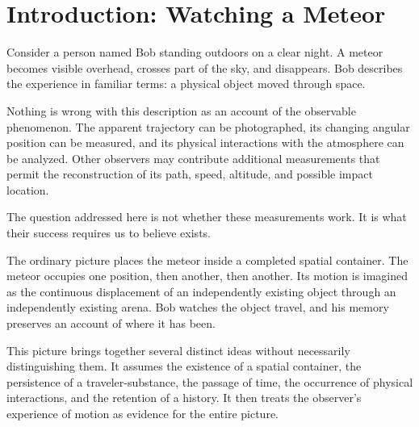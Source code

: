 \documentclass[12pt,onecolumn]{article}
\begin{document}
\begin{abstract}
The paper further adopts the TLM proposition that physical actuality is singular: there is one universal present, while elapsed proper time is local and information becomes available through relativistically constrained registration. This universal-present proposition is ontological and is not identified with an observer-independent global simultaneity coordinate.

The result is a standalone foundations argument. It does not modify established equations or predictions of quantum mechanics, special relativity, or general relativity. Its contribution is to distinguish timeless law from physical registration, and registered spatial experience from an independently existing spatial container, while identifying the additional mathematical work required to turn this interpretation into a predictive physical theory.
\end{abstract}

\section{Introduction: Watching a Meteor}

Consider a person named Bob standing outdoors on a clear night. A meteor becomes visible overhead, crosses part of the sky, and disappears. Bob describes the experience in familiar terms: a physical object moved through space.

Nothing is wrong with this description as an account of the observable phenomenon. The apparent trajectory can be photographed, its changing angular position can be measured, and its physical interactions with the atmosphere can be analyzed. Other observers may contribute additional measurements that permit the reconstruction of its path, speed, altitude, and possible impact location.

The question addressed here is not whether these measurements work. It is what their success requires us to believe exists.

The ordinary picture places the meteor inside a completed spatial container. The meteor occupies one position, then another, then another. Its motion is imagined as the continuous displacement of an independently existing object through an independently existing arena. Bob watches the object travel, and his memory preserves an account of where it has been.

This picture brings together several distinct ideas without necessarily distinguishing them. It assumes the existence of a spatial container, the persistence of a traveler-substance, the passage of time, the occurrence of physical interactions, and the retention of a history. It then treats the observer's experience of motion as evidence for the entire picture.
\end{document}
